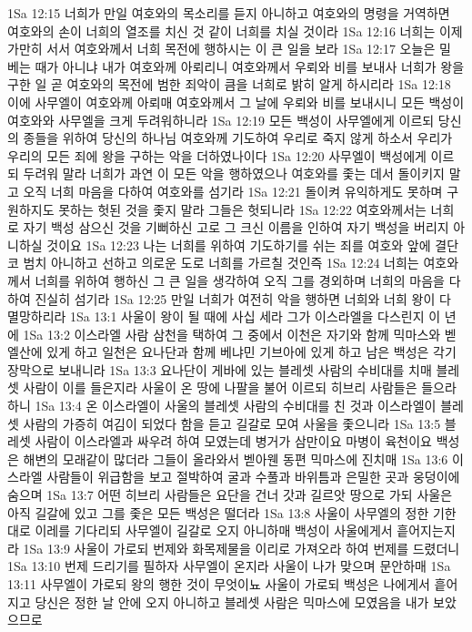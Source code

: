 1Sa 12:15  너희가 만일 여호와의 목소리를 듣지 아니하고 여호와의 명령을 거역하면 여호와의 손이 너희의 열조를 치신 것 같이 너희를 치실 것이라
1Sa 12:16  너희는 이제 가만히 서서 여호와께서 너희 목전에 행하시는 이 큰 일을 보라
1Sa 12:17  오늘은 밀 베는 때가 아니냐 내가 여호와께 아뢰리니 여호와께서 우뢰와 비를 보내사 너희가 왕을 구한 일 곧 여호와의 목전에 범한 죄악이 큼을 너희로 밝히 알게 하시리라
1Sa 12:18  이에 사무엘이 여호와께 아뢰매 여호와께서 그 날에 우뢰와 비를 보내시니 모든 백성이 여호와와 사무엘을 크게 두려워하니라
1Sa 12:19  모든 백성이 사무엘에게 이르되 당신의 종들을 위하여 당신의 하나님 여호와께 기도하여 우리로 죽지 않게 하소서 우리가 우리의 모든 죄에 왕을 구하는 악을 더하였나이다
1Sa 12:20  사무엘이 백성에게 이르되 두려워 말라 너희가 과연 이 모든 악을 행하였으나 여호와를 좇는 데서 돌이키지 말고 오직 너희 마음을 다하여 여호와를 섬기라
1Sa 12:21  돌이켜 유익하게도 못하며 구원하지도 못하는 헛된 것을 좇지 말라 그들은 헛되니라
1Sa 12:22  여호와께서는 너희로 자기 백성 삼으신 것을 기뻐하신 고로 그 크신 이름을 인하여 자기 백성을 버리지 아니하실 것이요
1Sa 12:23  나는 너희를 위하여 기도하기를 쉬는 죄를 여호와 앞에 결단코 범치 아니하고 선하고 의로운 도로 너희를 가르칠 것인즉
1Sa 12:24  너희는 여호와께서 너희를 위하여 행하신 그 큰 일을 생각하여 오직 그를 경외하며 너희의 마음을 다하여 진실히 섬기라
1Sa 12:25  만일 너희가 여전히 악을 행하면 너희와 너희 왕이 다 멸망하리라
1Sa 13:1  사울이 왕이 될 때에 사십 세라 그가 이스라엘을 다스린지 이 년에
1Sa 13:2  이스라엘 사람 삼천을 택하여 그 중에서 이천은 자기와 함께 믹마스와 벧엘산에 있게 하고 일천은 요나단과 함께 베냐민 기브아에 있게 하고 남은 백성은 각기 장막으로 보내니라
1Sa 13:3  요나단이 게바에 있는 블레셋 사람의 수비대를 치매 블레셋 사람이 이를 들은지라 사울이 온 땅에 나팔을 불어 이르되 히브리 사람들은 들으라 하니
1Sa 13:4  온 이스라엘이 사울의 블레셋 사람의 수비대를 친 것과 이스라엘이 블레셋 사람의 가증히 여김이 되었다 함을 듣고 길갈로 모여 사울을 좇으니라
1Sa 13:5  블레셋 사람이 이스라엘과 싸우려 하여 모였는데 병거가 삼만이요 마병이 육천이요 백성은 해변의 모래같이 많더라 그들이 올라와서 벧아웬 동편 믹마스에 진치매
1Sa 13:6  이스라엘 사람들이 위급함을 보고 절박하여 굴과 수풀과 바위틈과 은밀한 곳과 웅덩이에 숨으며
1Sa 13:7  어떤 히브리 사람들은 요단을 건너 갓과 길르앗 땅으로 가되 사울은 아직 길갈에 있고 그를 좇은 모든 백성은 떨더라
1Sa 13:8  사울이 사무엘의 정한 기한대로 이레를 기다리되 사무엘이 길갈로 오지 아니하매 백성이 사울에게서 흩어지는지라
1Sa 13:9  사울이 가로되 번제와 화목제물을 이리로 가져오라 하여 번제를 드렸더니
1Sa 13:10  번제 드리기를 필하자 사무엘이 온지라 사울이 나가 맞으며 문안하매
1Sa 13:11  사무엘이 가로되 왕의 행한 것이 무엇이뇨 사울이 가로되 백성은 나에게서 흩어지고 당신은 정한 날 안에 오지 아니하고 블레셋 사람은 믹마스에 모였음을 내가 보았으므로
